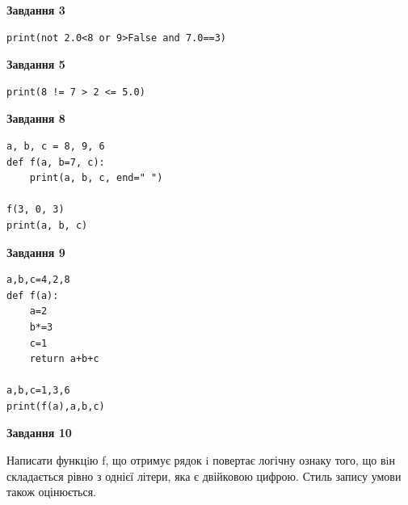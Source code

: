 \documentclass[12pt, ukrainian]{article}
\begin{document}
{\begin {large}
\begin{minipage}[t]{7.5cm}
\end{minipage}
\vline \hspace{6mm}
\begin{minipage}[t]{10.5cm}

\begin{center}
\textbf{Завдання 3}
\end{center}

\begin{verbatim}
print(not 2.0<8 or 9>False and 7.0==3)
\end{verbatim}



\begin{center}
\textbf{Завдання 5}
\end{center}

\begin{verbatim}
print(8 != 7 > 2 <= 5.0)
\end{verbatim}



\begin{center}
\textbf{Завдання 8}
\end{center}

\begin{verbatim}
a, b, c = 8, 9, 6
def f(a, b=7, c):
    print(a, b, c, end=" ")

f(3, 0, 3)
print(a, b, c)
\end{verbatim}



\begin{center}
\textbf{Завдання 9}
\end{center}

\begin{verbatim}
a,b,c=4,2,8
def f(a):
    a=2
    b*=3
    c=1
    return a+b+c

a,b,c=1,3,6
print(f(a),a,b,c)
\end{verbatim}



\begin{center}
\textbf{Завдання 10}
\end{center}

Написати функцiю f, що отримує рядок i повертає логічну ознаку того, що вiн складається рівно з однієї літери, яка є двійковою цифрою. Стиль запису умови також оцінюється.\par

\end{minipage}

\end {large}}
\newpage
\end{document}
